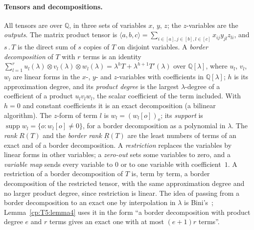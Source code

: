 \documentclass[11pt]{article}
\theoremstyle{definition}
\theoremstyle{remark}
\providecommand{\Q}{\mathbb{Q}}
\DeclareMathOperator{\supp}{supp}
\newcommand{\bR}{\underline{R}}               %
\newcommand{\mat}[3]{\langle #1,#2,#3\rangle} %
\newcommand{\cp}{\mathbin{.}}                 %
\begin{document}
\paragraph{Tensors and decompositions.} All tensors are over $\Q$, in three sets of variables $x$, $y$, $z$; the $z$-variables are the \emph{outputs}. The matrix product tensor is $\mat abc=\sum_{i\in[a],j\in[b],l\in[c]}x_{ij}y_{jl}z_{li}$, and $s\cp T$ is the direct sum of $s$ copies of $T$ on disjoint variables. A \emph{border decomposition} of $T$ with $r$ terms is an identity $\sum_{l=1}^ru_l(\lambda)\otimes v_l(\lambda)\otimes w_l(\lambda)=\lambda^hT+\lambda^{h+1}T'(\lambda)$ over $\Q[\lambda]$, where $u_l$, $v_l$, $w_l$ are linear forms in the $x$-, $y$- and $z$-variables with coefficients in $\Q[\lambda]$; $h$ is its approximation degree, and its \emph{product degree} is the largest $\lambda$-degree of a coefficient of a product $u_lv_lw_l$, the scalar coefficient of the term included. With $h=0$ and constant coefficients it is an exact decomposition (a bilinear algorithm). The $z$-form of term $l$ is $w_l=(w_l[o])_o$; its \emph{support} is $\supp w_l=\{o:w_l[o]\ne0\}$, for a border decomposition as a polynomial in $\lambda$. The \emph{rank} $R(T)$ and the \emph{border rank} $\bR(T)$ are the least numbers of terms of an exact and of a border decomposition. A \emph{restriction} replaces the variables by linear forms in other variables; a \emph{zero-out} sets some variables to zero, and a \emph{variable map} sends every variable to $0$ or to one variable with coefficient~$1$. A restriction of a border decomposition of $T$ is, term by term, a border decomposition of the restricted tensor, with the same approximation degree and no larger product degree, since restriction is linear. The idea of passing from a border decomposition to an exact one by interpolation in $\lambda$ is Bini's~\cite{Bin80}; Lemma~\ref{cp:T5:lemma4} uses it in the form ``a border decomposition with product degree $e$ and $r$ terms gives an exact one with at most $(e+1)r$ terms''.
\end{document}
